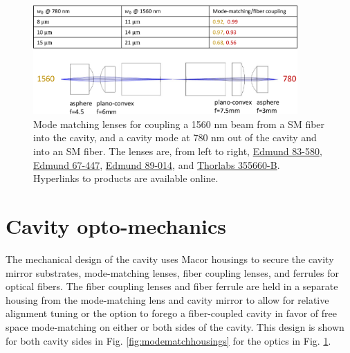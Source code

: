 \begin{figure}[!ht]
    \centering
    \includegraphics[width=0.9\textwidth]{Images/zemax_cavity_design.pdf}
    \caption{Mode matching lenses for coupling a 1560 nm beam from a SM fiber into the cavity, and a cavity mode at 780 nm out of the cavity and into an SM fiber. The lenses are, from left to right, \href{https://www.edmundoptics.com/p/043-na-450mm-fl-1050-1600nm-ar-coated-molded-aspheric-lens/26661/}{Edmund 83-580}, \href{https://www.edmundoptics.com/p/40mm-dia-x-60mm-fl-nir-ii-coated-plano-convex-lens/21908/}{Edmund 67-447}, \href{https://www.edmundoptics.com/p/50mm-diameter-x-75mm-fl-785nm-v-coat-pcx-lens/31486/}{Edmund 89-014}, and \href{https://www.thorlabs.com/thorproduct.cfm?partnumber=355660-B}{Thorlabs 355660-B}. Hyperlinks to products are available online.}
    \label{fig:modematchdesign}
\end{figure}

\section{Cavity opto-mechanics}\label{sec:cavopto}

The mechanical design of the cavity uses Macor housings to secure the cavity mirror substrates, mode-matching lenses, fiber coupling lenses, and ferrules for optical fibers. The fiber coupling lenses and fiber ferrule are held in a separate housing from the mode-matching lens and cavity mirror to allow for relative alignment tuning or the option to forego a fiber-coupled cavity in favor of free space mode-matching on either or both sides of the cavity. This design is shown for both cavity sides in Fig. \ref{fig:modematchhousings} for the optics in Fig. \ref{fig:modematchdesign}.

